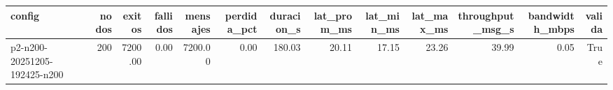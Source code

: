 \begin{tabular}{lrrrrrrrrrrrr}
\toprule
config & nodos & exitos & fallidos & mensajes & perdida_pct & duracion_s & lat_prom_ms & lat_min_ms & lat_max_ms & throughput_msg_s & bandwidth_mbps & valida \\
\midrule
p2-n200-20251205-192425-n200 & 200 & 7200.00 & 0.00 & 7200.00 & 0.00 & 180.03 & 20.11 & 17.15 & 23.26 & 39.99 & 0.05 & True \\
\bottomrule
\end{tabular}
